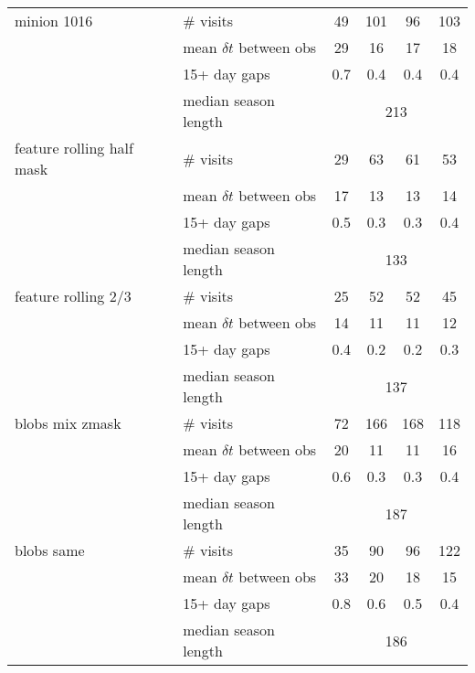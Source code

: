 \begin{appendices}
\begin{longtable}{l|l|cccc}
  minion 1016    & \# visits                   &   49 & 101  &  96  & 103  \\
                 & mean $\delta t$ between obs &   29 &  16  &  17  &  18  \\
                 & 15+ day gaps                &  0.7 & 0.4  & 0.4  & 0.4  \\
                 & median season length               & \multicolumn{4}{c}{213}   \\
  \hline

  feature rolling half mask & \# visits        &  29  &  63  &  61  &  53  \\
                 & mean $\delta t$ between obs &  17  &  13  &  13  &  14  \\
                 & 15+ day gaps                & 0.5  & 0.3  & 0.3  & 0.4  \\
                 & median season length               & \multicolumn{4}{c}{133}   \\
  \hline

  feature rolling 2/3       & \# visits        &  25  &  52  &  52  & 45   \\
                 & mean $\delta t$ between obs &  14  &  11  &  11  & 12   \\
                 & 15+ day gaps                & 0.4  & 0.2  & 0.2  & 0.3  \\
                 & median season length               & \multicolumn{4}{c}{137}   \\
  \hline

 blobs mix zmask & \# visits                   &  72  & 166  &  168 & 118  \\
                 & mean $\delta t$ between obs &  20  &  11  &   11 &  16  \\
                 & 15+ day gaps                & 0.6  & 0.3  &  0.3 & 0.4  \\
                 & median season length               & \multicolumn{4}{c}{187}   \\
  \hline
  
 blobs same      & \# visits                   &  35  &  90  &  96  & 122  \\
                 & mean $\delta t$ between obs &  33  &  20  &  18  &  15  \\
                 & 15+ day gaps                & 0.8  & 0.6  & 0.5  & 0.4  \\
                 & median season length               & \multicolumn{4}{c}{186}   \\
  \hline


\end{longtable}
\end{appendices}
